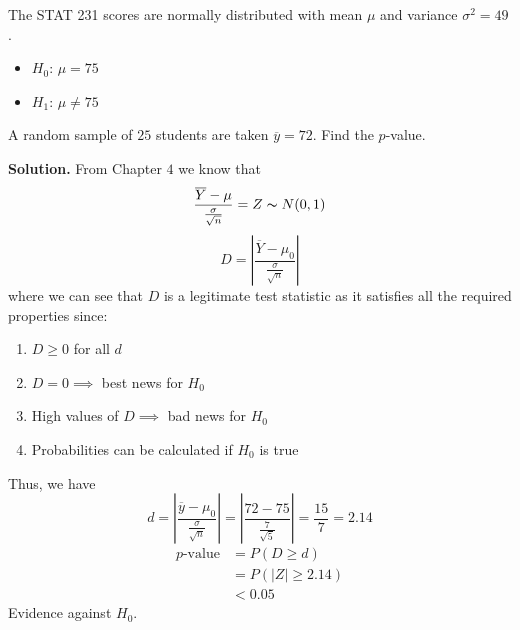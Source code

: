 \begin{exbox}
    \begin{example}
        The STAT 231 scores are normally distributed with mean $ \mu $
        and variance $ \sigma^2=49 $.
        \begin{itemize}
            \item $ H_0 $: $ \mu=75 $
            \item $ H_1 $: $ \mu\neq 75 $
        \end{itemize}
        A random sample of $ 25 $ students are taken $ \overline{y}=72 $.
        Find the $ p $-value.

        \textbf{Solution.}
        From Chapter $ 4 $ we know that
        \[ \frac{\overline{Y}-\mu}{\frac{\sigma}{\sqrt{n}}} =Z \thicksim N(0,1) \]
        \[ D=\left|\frac{\overline{Y}-\mu_0}{\frac{\sigma}{\sqrt{n}}}\right| \]
        where we can see that $ D $ is a legitimate test statistic as
        it satisfies all the required properties since:
        \begin{enumerate}
            \item $ D\geqslant 0 $ for all $ d $
            \item $ D=0\implies $ best news for $ H_0 $
            \item High values of $ D \implies $ bad news for $ H_0 $
            \item Probabilities can be calculated if $ H_0 $ is true
        \end{enumerate}
        Thus, we have
        \[ d=\left|\frac{\overline{y}-\mu_0}{\frac{\sigma}{\sqrt{n}}}\right|=
            \left|\frac{72-75}{\frac{7}{\sqrt{5}}} \right|=\frac{15}{7} =2.14 \]
        \begin{align*}
            p\text{-value}
             & =P(D\geqslant d)      \\
             & =P(|Z|\geqslant 2.14) \\
             & <0.05
        \end{align*}
        Evidence against $ H_0 $.
    \end{example}
\end{exbox}

